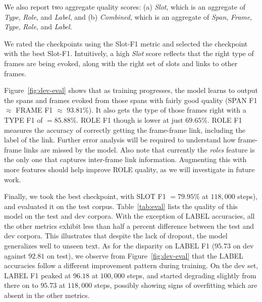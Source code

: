 \documentclass[11pt,a4paper]{article}
\begin{document}
We also report two aggregate quality scores: (a) {\em Slot}, which is
an aggregate of {\em Type}, {\em Role}, and {\em Label}, and (b) {\em Combined},
which is an aggregate of {\em Span}, {\em Frame}, {\em Type}, {\em Role}, and
{\em Label}.

We rated the checkpoints using the Slot-F1 metric and selected the checkpoint with
the best Slot-F1. Intuitively, a high {\em Slot} score reflects that the
right type of frames are being evoked, along with the right set of slots and
links to other frames.

Figure~\ref{fig:dev-eval} shows that as training progresses,
the model learns to output the spans and frames evoked from those spans with
fairly good quality (SPAN F1 $\approx$ FRAME F1 $\approx$ $93.81\%$). It also
gets the type of those frames right with a TYPE F1 of $= 85.88\%$. ROLE F1
though is lower at just $69.65\%$. ROLE F1 measures the accuracy of correctly
getting the frame-frame link, including the label of the link. Further error
analysis will be required to understand how frame-frame links are missed by
the model. Also note that currently the {\em roles} feature is the only one
that captures inter-frame link information.
Augmenting this with more features should help improve ROLE quality, as we will
investigate in future work.

Finally, we took the best checkpoint, with SLOT F1 $= 79.95\%$ at $118,000$ steps),
and evaluated it on the test corpus.
Table~\ref{tab:eval} lists the quality of this model on the test and dev
corpora.
With the exception of LABEL accuracies, all the other metrics exhibit less than
half a percent difference between the test and dev corpora. This illustrates
that despite the lack of dropout, the model generalizes well to unseen text.
As for the disparity on LABEL F1 ($95.73$ on dev
against $92.81$ on test), we observe from Figure~\ref{fig:dev-eval}
that the LABEL accuracies follow a different improvement pattern
during training. On the dev set, LABEL F1 peaked at $96.18$ at $100,000$ steps,
and started degrading slightly from there on to $95.73$ at $118,000$ steps,
possibly showing signs of overfitting which are absent in the other metrics.
\end{document}

